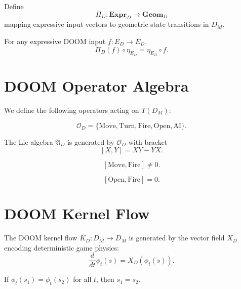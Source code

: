 \begin{definition}
Define
\[
\Pi_D : \mathbf{Expr}_D \to \mathbf{Geom}_D
\]
mapping expressive input vectors to geometric state transitions in $D_M$.
\end{definition}

\begin{theorem}
For any expressive DOOM input $f : E_D \to E_D$,
\[
\Pi_D(f) \circ \eta_{E_D} = \eta_{E_D} \circ f.
\]
\end{theorem}

\section{DOOM Operator Algebra}

We define the following operators acting on $T(D_M)$:

\[
\mathcal{O}_D = 
\{\mathrm{Move}, \mathrm{Turn}, \mathrm{Fire}, \mathrm{Open}, \mathrm{AI}\}.
\]

\begin{definition}
The Lie algebra $\mathfrak{A}_D$ is generated by $\mathcal{O}_D$ with bracket
\[
[X,Y] = XY - YX.
\]
\end{definition}

\begin{theorem}
\[
[\mathrm{Move}, \mathrm{Fire}] \neq 0.
\]
\end{theorem}

\begin{theorem}
\[
[\mathrm{Open}, \mathrm{Fire}] = 0.
\]
\end{theorem}

\section{DOOM Kernel Flow}

\begin{definition}
The DOOM kernel flow $K_D : D_M \to D_M$ is generated by the vector field
$X_D$ encoding deterministic game physics:
\[
\frac{d}{dt} \phi_t(s) = X_D(\phi_t(s)).
\]
\end{definition}

\begin{theorem}
If $\phi_t(s_1) = \phi_t(s_2)$ for all $t$, then $s_1 = s_2$.
\end{theorem}

